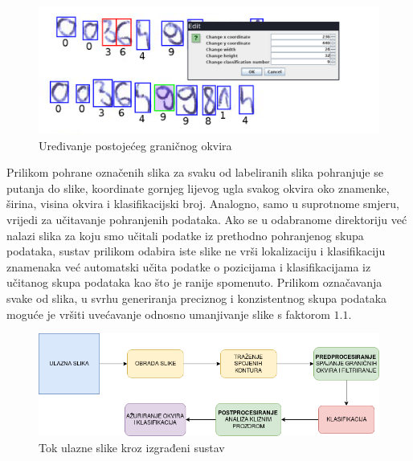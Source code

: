 \documentclass[times, utf8, diplomski]{fer}
\theoremstyle{definition}
\begin{document}
\begin{figure}[h]
	\centering
	\includegraphics[scale=0.5]{edit.png}
	\caption{Uređivanje postojećeg graničnog okvira}
\end{figure}
Prilikom pohrane označenih slika za svaku od labeliranih slika pohranjuje se putanja do slike, koordinate gornjeg lijevog ugla svakog okvira oko znamenke, širina, visina okvira i klasifikacijski broj. Analogno, samo u suprotnome smjeru, vrijedi za učitavanje pohranjenih podataka. Ako se u odabranome direktoriju već nalazi slika za koju smo učitali podatke iz prethodno pohranjenog skupa podataka, sustav prilikom odabira iste slike ne vrši lokalizaciju i klasifikaciju znamenaka već automatski učita podatke o pozicijama i klasifikacijama iz učitanog skupa podataka kao što je ranije spomenuto.
\newline
Prilikom označavanja svake od slika, u svrhu generiranja preciznog i konzistentnog skupa podataka moguće je vršiti uvećavanje odnosno umanjivanje slike s faktorom $1.1$.
\newline
\newline
\begin{figure}[h]
	\centering
	\includegraphics[scale=0.6]{system_arhitecture.png}
	\caption{Tok ulazne slike kroz izgrađeni sustav}
\end{figure}
\end{document}
